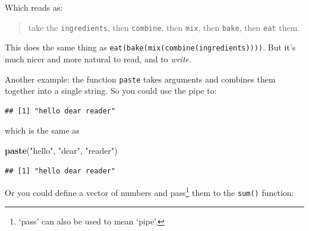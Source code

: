 \documentclass[]{book}
\newenvironment{Shaded}{\begin{snugshade}}{\end{snugshade}}
\newcommand{\DecValTok}[1]{\textcolor[rgb]{0.00,0.00,0.81}{#1}}
\newcommand{\KeywordTok}[1]{\textcolor[rgb]{0.13,0.29,0.53}{\textbf{#1}}}
\newcommand{\NormalTok}[1]{#1}
\newcommand{\OperatorTok}[1]{\textcolor[rgb]{0.81,0.36,0.00}{\textbf{#1}}}
\newcommand{\StringTok}[1]{\textcolor[rgb]{0.31,0.60,0.02}{#1}}
\begin{document}
Which reads as:

\begin{quote}
take the \texttt{ingredients}, then \texttt{combine}, then \texttt{mix}, then \texttt{bake}, then \texttt{eat} them.
\end{quote}

This does the same thing as \texttt{eat(bake(mix(combine(ingredients))))}. But it's much nicer and more natural to read, and to \emph{write}.

Another example: the function \texttt{paste} takes arguments and combines them together into a single string. So you could use the pipe to:

\begin{Shaded}
\end{Shaded}

\begin{verbatim}
## [1] "hello dear reader"
\end{verbatim}

which is the same as

\begin{Shaded}
\begin{Highlighting}[]
\KeywordTok{paste}\NormalTok{(}\StringTok{"hello"}\NormalTok{, }\StringTok{"dear"}\NormalTok{, }\StringTok{"reader"}\NormalTok{)}
\end{Highlighting}
\end{Shaded}

\begin{verbatim}
## [1] "hello dear reader"
\end{verbatim}

Or you could define a vector of numbers and pass\footnote{`pass' can also be used to mean `pipe'.} them to the \texttt{sum()} function:

\begin{Shaded}
\end{Shaded}
\end{document}
